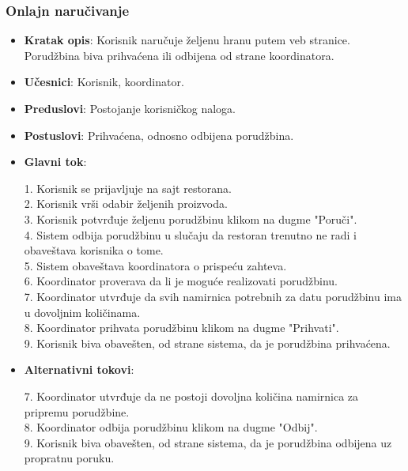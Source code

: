 \subsubsection{Onlajn naručivanje}
\begin{itemize}
    \item \textbf{Kratak opis}: Korisnik naručuje željenu hranu putem veb stranice. Porudžbina biva prihvaćena ili odbijena od strane koordinatora.
    \item \textbf{Učesnici}: Korisnik, koordinator.
    \item \textbf{Preduslovi}: Postojanje korisničkog naloga.
    \item \textbf{Postuslovi}: Prihvaćena, odnosno odbijena porudžbina.
    \item \textbf{Glavni tok}:
    
    1. Korisnik se prijavljuje na sajt restorana.\\
    2. Korisnik vrši odabir željenih proizvoda.\\
    3. Korisnik potvrđuje željenu porudžbinu klikom na dugme "Poruči".\\
    4. Sistem odbija porudžbinu u slučaju da restoran trenutno ne radi i obaveštava korisnika o tome.\\
    5. Sistem obaveštava koordinatora o prispeću zahteva.\\
    6. Koordinator proverava da li je moguće realizovati porudžbinu.\\
    7. Koordinator utvrđuje da svih namirnica potrebnih za datu porudžbinu ima u dovoljnim količinama.\\
    8. Koordinator prihvata porudžbinu klikom na dugme "Prihvati".\\
    9. Korisnik biva obavešten, od strane sistema, da je porudžbina prihvaćena.
    
     \item \textbf{Alternativni tokovi}:
     
     7. Koordinator utvrđuje da ne postoji dovoljna količina namirnica za pripremu porudžbine.\\
     8. Koordinator odbija porudžbinu klikom na dugme "Odbij".\\
     9. Korisnik biva obavešten, od strane sistema, da je porudžbina odbijena uz propratnu poruku.
    
\end{itemize}

